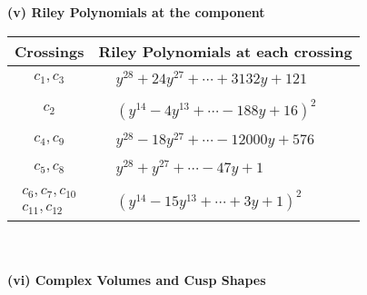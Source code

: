 \documentclass[1p]{elsarticle_modified}
\theoremstyle{definition}
\begin{document}
\flushleft \textbf{(v) Riley Polynomials at the component}\newline \\
\begin{tabular}{m{50pt}|m{274pt}}
Crossings & \hspace{64pt}Riley Polynomials at each crossing \\
\hline $$\begin{aligned}c_{1},c_{3}\end{aligned}$$&$\begin{aligned}
&y^{28}+24 y^{27}+\cdots+3132 y+121
\end{aligned}$\\
\hline $$\begin{aligned}c_{2}\end{aligned}$$&$\begin{aligned}
&(y^{14}-4 y^{13}+\cdots-188 y+16)^{2}
\end{aligned}$\\
\hline $$\begin{aligned}c_{4},c_{9}\end{aligned}$$&$\begin{aligned}
&y^{28}-18 y^{27}+\cdots-12000 y+576
\end{aligned}$\\
\hline $$\begin{aligned}c_{5},c_{8}\end{aligned}$$&$\begin{aligned}
&y^{28}+y^{27}+\cdots-47 y+1
\end{aligned}$\\
\hline $$\begin{aligned}c_{6},c_{7},c_{10}\\c_{11},c_{12}\end{aligned}$$&$\begin{aligned}
&(y^{14}-15 y^{13}+\cdots+3 y+1)^{2}
\end{aligned}$\\
\hline
\end{tabular}\\~\\
\newpage\flushleft \textbf{(vi) Complex Volumes and Cusp Shapes}
\end{document}
